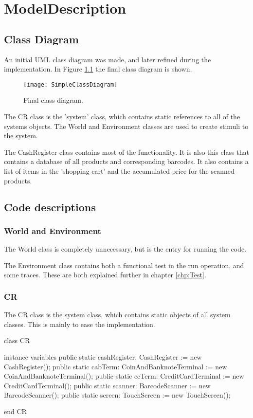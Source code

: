 \chapter{ModelDescription}

\section{Class Diagram}
An initial UML class diagram was made, and later refined during the implementation. 
In Figure \ref{fig:SimpleClassDiagram} the final class diagram is shown.

\begin{figure}[H]
\centering
\texttt{[image: SimpleClassDiagram]}
\caption{Final class diagram.}
\label{fig:SimpleClassDiagram}
\end{figure}

The CR class is the 'system' class, which contains static references to all of the systems objects. 
The World and Environment classes are used to create stimuli to the system.

The CashRegister class contains most of the functionality. It is also this class that contains a database of all products and corresponding barcodes. 
It also contains a list of items in the 'shopping cart' and the accumulated price for the scanned products.

\section{Code descriptions}

\subsection{World and Environment}
The World class is completely unnecessary, but is the entry for running the code.

The Environment class contains both a functional test in the run operation, and some traces. These are both explained further in chapter \ref{chp:Test}.

\subsection{CR}
The CR class is the system class, which contains static objects of all system classes. This is mainly to ease the implementation.
\begin{vdmpp}
class CR
 
instance variables
 public static cashRegister: CashRegister := new CashRegister(); 
 public static cabTerm: CoinAndBanknoteTerminal := new CoinAndBanknoteTerminal();
 public static ccTerm: CreditCardTerminal := new CreditCardTerminal();
 public static scanner: BarcodeScanner := new BarcodeScanner();
 public static screen: TouchScreen := new TouchScreen(); 
  
end CR
\end{vdmpp}


